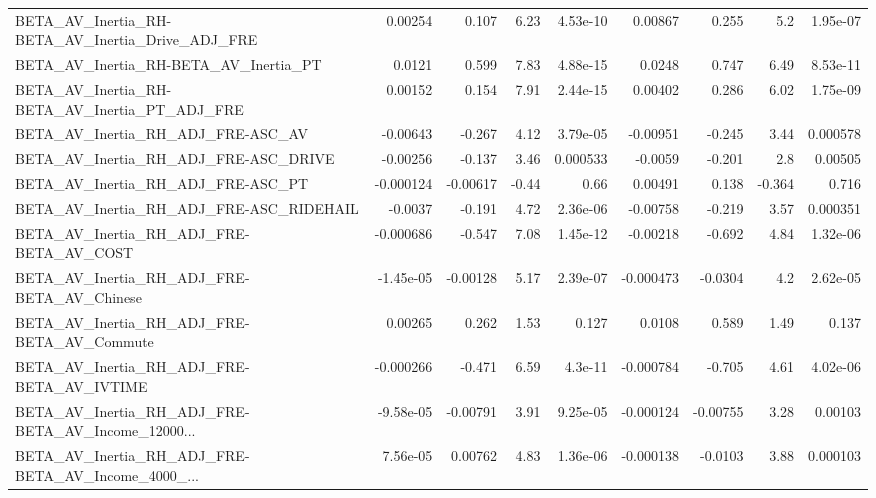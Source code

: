 \begin{tabular}{lrrrrrrrr}
BETA\_AV\_Inertia\_RH-BETA\_AV\_Inertia\_Drive\_ADJ\_FRE   &     0.00254 &        0.107 &     6.23 & 4.53e-10 &    0.00867 &       0.255 &          5.2 &      1.95e-07 \\
BETA\_AV\_Inertia\_RH-BETA\_AV\_Inertia\_PT              &      0.0121 &        0.599 &     7.83 & 4.88e-15 &     0.0248 &       0.747 &         6.49 &      8.53e-11 \\
BETA\_AV\_Inertia\_RH-BETA\_AV\_Inertia\_PT\_ADJ\_FRE      &     0.00152 &        0.154 &     7.91 & 2.44e-15 &    0.00402 &       0.286 &         6.02 &      1.75e-09 \\
BETA\_AV\_Inertia\_RH\_ADJ\_FRE-ASC\_AV                  &    -0.00643 &       -0.267 &     4.12 & 3.79e-05 &   -0.00951 &      -0.245 &         3.44 &      0.000578 \\
BETA\_AV\_Inertia\_RH\_ADJ\_FRE-ASC\_DRIVE               &    -0.00256 &       -0.137 &     3.46 & 0.000533 &    -0.0059 &      -0.201 &          2.8 &       0.00505 \\
BETA\_AV\_Inertia\_RH\_ADJ\_FRE-ASC\_PT                  &   -0.000124 &     -0.00617 &    -0.44 &     0.66 &    0.00491 &       0.138 &       -0.364 &         0.716 \\
BETA\_AV\_Inertia\_RH\_ADJ\_FRE-ASC\_RIDEHAIL            &     -0.0037 &       -0.191 &     4.72 & 2.36e-06 &   -0.00758 &      -0.219 &         3.57 &      0.000351 \\
BETA\_AV\_Inertia\_RH\_ADJ\_FRE-BETA\_AV\_COST            &   -0.000686 &       -0.547 &     7.08 & 1.45e-12 &   -0.00218 &      -0.692 &         4.84 &      1.32e-06 \\
BETA\_AV\_Inertia\_RH\_ADJ\_FRE-BETA\_AV\_Chinese         &   -1.45e-05 &     -0.00128 &     5.17 & 2.39e-07 &  -0.000473 &     -0.0304 &          4.2 &      2.62e-05 \\
BETA\_AV\_Inertia\_RH\_ADJ\_FRE-BETA\_AV\_Commute         &     0.00265 &        0.262 &     1.53 &    0.127 &     0.0108 &       0.589 &         1.49 &         0.137 \\
BETA\_AV\_Inertia\_RH\_ADJ\_FRE-BETA\_AV\_IVTIME          &   -0.000266 &       -0.471 &     6.59 &  4.3e-11 &  -0.000784 &      -0.705 &         4.61 &      4.02e-06 \\
BETA\_AV\_Inertia\_RH\_ADJ\_FRE-BETA\_AV\_Income\_12000... &   -9.58e-05 &     -0.00791 &     3.91 & 9.25e-05 &  -0.000124 &    -0.00755 &         3.28 &       0.00103 \\
BETA\_AV\_Inertia\_RH\_ADJ\_FRE-BETA\_AV\_Income\_4000\_... &    7.56e-05 &      0.00762 &     4.83 & 1.36e-06 &  -0.000138 &     -0.0103 &         3.88 &      0.000103 \\

\end{tabular}
